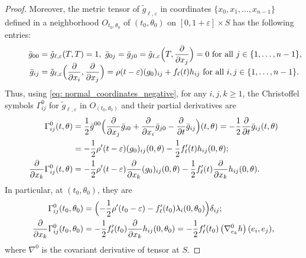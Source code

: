 \documentclass[JEP,XML,SOM,Unicode,NoFloatCountersInSection]{cedram}
\theoremstyle{definition}
\let\eps\varepsilon
\renewcommand{\>}{{\rangle}}
\newcommand{\<}{{\langle}}
\begin{document}
\begin{proof}
Moreover, the metric tensor of $\tilde g_{\ell,\eps}$ in coordinates $\{x_0, x_1,\ldots, x_{n-1}\}$ defined in a neighborhood $O_{t_0,\theta_0}$ of $(t_0,\theta_0)$ on $[0,1+\eps]\times S$ has the following entries:
\begin{align}
\hspace*{1cm}\bar g_{00} &= \tilde g_{\ell,\eps}(T, T)=1, \ \bar g_{0j} = \bar g_{j0}=\tilde g_{\ell,\eps}\Bigl(T,\frac{\partial}{\partial x_j}\Bigr)=0 \text{ for all } j\in\{1,\ldots,n-1\},\notag\\[-11pt]\label{metric_tensor_negative}\\[-11pt]
\hspace*{1cm}\bar g_{ij} &= \tilde g_{\ell,\eps}\Bigl(\frac{\partial}{\partial x_i},\frac{\partial}{\partial x_j}\Bigr) = \rho(t-\eps)(g_0)_{ij}+f_\ell(t)h_{ij} \text{ for all } i,j\in\{1,\ldots, n-1\}.\nonumber
\end{align}
Thus, using \eqref{eq: normal_coordinates_negative}, for any $i,j,k\geq 1$, the Christoffel symbols $\Gamma^0_{ij}$ for $\tilde g_{\ell,\eps}$ in $O_{(t_0,\theta_0)}$ and their partial derivatives are
\begin{align*}
\Gamma^0_{ij}(t,\theta) &= \frac{1}{2}\bar g^{00}\Bigl(\frac{\partial}{\partial x_j}\bar g_{i0}+\frac{\partial}{\partial x_i}\bar g_{j0}-\frac{\partial}{\partial t}\bar g_{ij}\Bigr) (t,\theta)= -\frac{1}{2}\frac{\partial}{\partial t}\bar g_{ij} (t,\theta)\\
&=-\frac{1}{2}\rho'(t-\eps)(g_0)_{ij} (0,\theta)-\frac{1}{2}f'_\ell(t)h_{ij} (0,\theta);
\\
\frac{\partial}{\partial x_k}\Gamma^0_{ij}(t,\theta)&=-\frac{1}{2}\rho'(t-\eps)\frac{\partial}{\partial x_k}(g_0)_{ij}(0,\theta)-\frac{1}{2}f'_\ell(t)\frac{\partial}{\partial x_k}h_{ij}(0,\theta).
\end{align*}
In particular, at $(t_0,\theta_0)$, they are
\begin{align*}
\Gamma^0_{ij}(t_0,\theta_0) &= \Bigl(-\frac{1}{2}\rho'(t_0-\eps)-f'_\ell(t_0)\lambda_i(0,\theta_0)\Bigr)\delta_{ij};
\\
\frac{\partial}{\partial x_k}\Gamma^0_{ij}(t_0,\theta_0)&=-\frac{1}{2}f'_\ell(t_0)\frac{\partial}{\partial x_k}h_{ij}(0,\theta_0) = -\frac{1}{2}f'_\ell(t_0)\left(\nabla^0_{e_k} h\right)(e_i,e_j),
\end{align*}
where $\nabla^0$ is the covariant derivative of tensor at $S$.


\end{proof}
\end{document}
